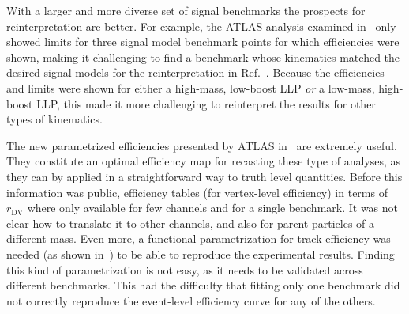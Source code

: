 \vskip 0.1in
\vskip 0.1in

With a larger and more diverse set of signal benchmarks the prospects for reinterpretation are better. For example, the ATLAS analysis examined in~\cite{ATLAS-CONF-2013-092} only showed limits for three signal model benchmark points for which efficiencies were shown, making it challenging to find a benchmark whose kinematics matched the desired signal models for the reinterpretation in Ref.~\cite{Cui:2014twa}. Because the efficiencies and limits were shown for either a high-mass, low-boost LLP \emph{or} a low-mass, high-boost LLP, this made it more challenging to reinterpret the results for other types of kinematics. 

The new parametrized efficiencies presented by ATLAS in~\cite{SUSY-2016-08} are extremely useful. They constitute an optimal efficiency map for recasting these type of analyses, as they can by applied in a straightforward way to truth level quantities. Before this information was public, efficiency tables (for vertex-level efficiency) in terms of $r_\mathrm{DV}$ where only available for few channels and for a single benchmark. It was not clear how to translate it to other channels, and also for parent particles of a different mass. Even more, a functional parametrization for track efficiency was needed (as shown in~\cite{Allanach:2016pam}) to be able to reproduce the experimental results. Finding this kind of parametrization is not easy, as it needs to be validated across different benchmarks. This had the difficulty that fitting only one benchmark did not correctly reproduce the event-level efficiency curve for any of the others.

%

